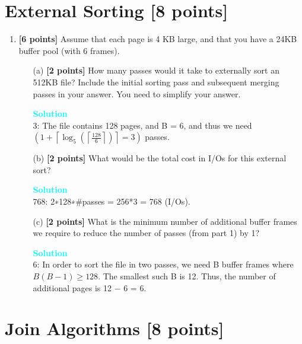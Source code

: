 \documentclass[10pt]{article}
\newenvironment{solution}
    { \begin{mdframed}[backgroundcolor=gray!10] \textcolor{cyan}{\textbf{Solution}} \\}
    {  \end{mdframed}}
\begin{document}
\section{External Sorting \textbf{[8 points]}}
\begin{enumerate}

	\item \textbf{[6 points]}
	      Assume that each page is 4 KB large, and that you have a 24KB buffer pool (with 6 frames).
	      \begin{itemize}
		      \item[(a)] \textbf{[2 points]} How many passes would it take to externally sort an 512KB file?
		            Include the initial sorting pass and subsequent merging passes in your answer. You need to simplify your answer.
		            \begin{solution}
			            3: The file contains 128 pages, and B = 6, and thus we need
			            $\left(1+\left\lceil\log _{5}\left(\left\lceil\frac{128}{6}\right\rceil\right)\right\rceil=3\right)$ passes.
		            \end{solution}
		      \item[(b)] \textbf{[2 points]} What would be the total cost in I/Os for this external sort?
		            \begin{solution}
			            768: 2∗128∗$\#$passes = 256*3 = 768 (I/Os).
		            \end{solution}
		      \item[(c)] \textbf{[2 points]} What is the minimum number of additional buffer frames we require to reduce the number of passes
		            (from part 1) by 1?
		            \begin{solution}
			            6: In order to sort the file in two passes, we need B buffer frames
			            where $B(B - 1) \geq 128$. The smallest such B is 12.
			            Thus, the number of additional pages is 12 − 6 = 6.
		            \end{solution}
	      \end{itemize}
\end{enumerate}


\newpage
\section{Join Algorithms \textbf{[8 points]}}
\end{document}

